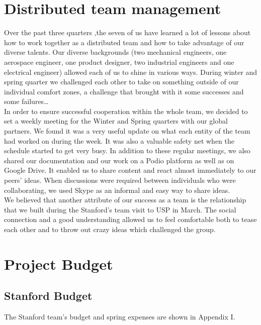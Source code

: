 \newpage

\section{Distributed team management}

Over the past three quarters ,the seven of us have learned a lot of lessons about how to work together as a distributed team and how to take advantage of our diverse talents. Our diverse backgrounds (two mechanical engineers, one aerospace engineer, one product designer, two industrial engineers and one electrical engineer) allowed each of us to shine in various ways. During winter and spring quarter we challenged each other to take on something outside of our individual comfort zones, a challenge that brought with it some successes and some failures…\\

In order to ensure successful cooperation within the whole team, we decided to set a weekly meeting for the Winter and Spring quarters with our global partners. We found it was a very useful update on what each entity of the team had worked on during the week. It was also a valuable safety net when the schedule started to get very busy. In addition to these regular meetings, we also shared our documentation and our work on a Podio platform as well as on Google Drive. It enabled us to share content and react almost immediately to our peers’ ideas. When discussions were required between individuals who were collaborating, we used Skype as an informal and easy way to share ideas.\\

We believed that another attribute of our success as a team is the relationship that we built during the Stanford’s team visit to USP in March. The social connection and a good understanding allowed us to feel comfortable both to tease each other and to throw out crazy ideas which challenged the group.

\section{Project Budget}

\subsection{Stanford Budget}
The Stanford team's budget and spring expenses are shown in Appendix I.


